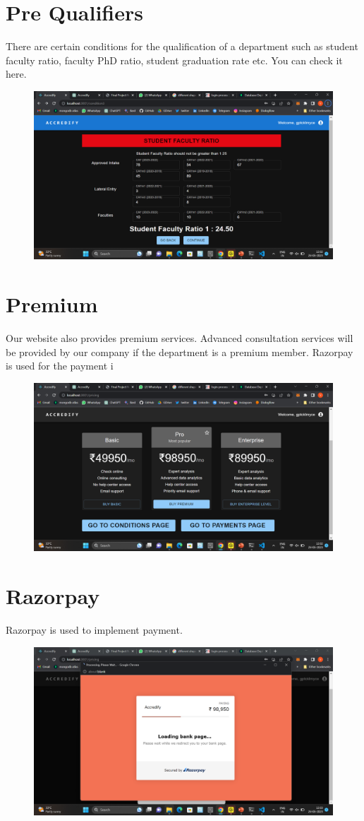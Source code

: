 \documentclass[a4paper,11pt]{report}
\begin{document}
\section{Pre Qualifiers}
There are certain conditions for the qualification of a department such as student faculty ratio, faculty PhD ratio, student graduation rate etc. You can check it here. 
\begin{figure}[h]
	\centering
	\hspace{21pt}
	\includegraphics[width=.70\linewidth]{accredify3.png}
	\label{fig:logo.png}
\end{figure}

\section{Premium}
Our website also provides premium services. Advanced consultation services will be provided by our company if the department is a premium member. Razorpay is used for the payment i
\begin{figure}[h]
	\centering
	\hspace{21pt}
	\includegraphics[width=.70\linewidth]{accredify4.png}
	\label{fig:logo.png}
\end{figure}
\section{Razorpay}
Razorpay is used to implement payment.
\begin{figure}[h]
	\centering
	\hspace{21pt}
	\includegraphics[width=.70\linewidth]{accredify6.png}
	\label{fig:logo.png}
\end{figure}
\end{document}
